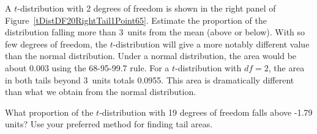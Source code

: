 \begin{examplewrap}
\begin{nexample}{A $t$-distribution with 2 degrees of freedom
    is shown in the right panel of
    Figure~\ref{tDistDF20RightTail1Point65}.
    Estimate the proportion of the distribution falling more
    than 3~units from the mean (above or below).}
  With so few degrees of freedom, the $t$-distribution will
  give a more notably different value than the normal
  distribution.
  Under a normal distribution, the area would be about
  0.003 using the 68-95-99.7 rule.
  For a $t$-distribution with $df = 2$, the area in both
  tails beyond 3~units totals 0.0955.
  This area is dramatically different than what
  we obtain from the normal distribution.
\end{nexample}
\end{examplewrap}

\begin{exercisewrap}
\begin{nexercise}
What proportion of the $t$-distribution with 19 degrees
of freedom falls above -1.79 units?
Use your preferred method for finding tail areas.\footnotemark{}
\end{nexercise}
\end{exercisewrap}



%
%
%


